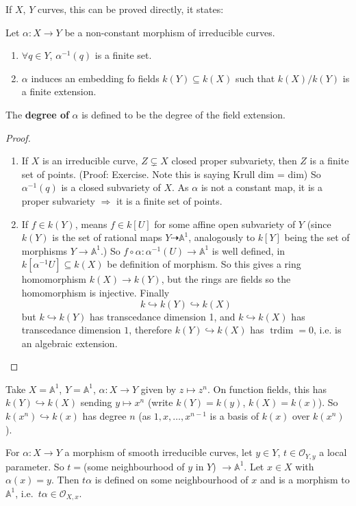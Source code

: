 \documentclass{article}
\newcommand{\A}{\mathbb{A}}
\DeclareMathOperator{\trdim}{trdim}
\begin{document}
If $X$, $Y$ curves, this can be proved directly, it states:
\begin{prop}
    Let $\alpha: X \to Y$ be a non-constant morphism of irreducible curves.
    \begin{enumerate}[label=(\roman*)]
        \item $\forall q \in Y$, $\alpha^{-1}(q)$ is a finite set.
        \item $\alpha$ induces an embedding fo fields $k(Y) \subseteq k(X)$ such that $k(X) / k(Y)$ is a finite extension.
    \end{enumerate}
\end{prop}
\begin{defi}
    The \textbf{degree of} $\alpha$ is defined to be the degree of the field extension.
\end{defi}
\begin{proof} \leavevmode
    \begin{enumerate}[label=(\roman*)]
        \item If $X$ is an irreducible curve, $Z \subsetneq X$ closed proper subvariety, then $Z$ is a finite set of points. (Proof: Exercise. Note this is saying Krull dim = dim)
            So $\alpha^{-1}(q)$ is a closed subvariety of $X$. As $\alpha$ is not a constant map, it is a proper subvariety $\Rightarrow$ it is a finite set of points.
        \item If $f \in k(Y)$, means $f \in k[U]$ for some affine open subvariety of $Y$ (since $k(Y)$ is the set of rational maps $Y \dashrightarrow \A^1$, analogously to $k[Y]$ being the set of morphisms $Y \to \A^1$.)
            So $f \circ \alpha: \alpha^{-1}(U) \to \A^1$ is well defined, in $k[\alpha^{-1} U] \subseteq k(X)$ be definition of morphism.
            So this gives a ring homomorphism $k(X) \to k(Y)$, but the rings are fields so the homomorphism is injective.
            Finally
            \begin{equation*}
                k \hookrightarrow k(Y) \hookrightarrow k(X)
            \end{equation*}
            but $k \hookrightarrow k(Y)$ has transcedance dimension 1, and $k \hookrightarrow k(X)$ has transcedance dimension $1$, therefore $k(Y) \hookrightarrow k(X)$ has $\trdim = 0$, i.e. is an algebraic extension.
    \end{enumerate}
\end{proof}
\begin{eg}
    Take $X =\A^1$, $Y = \A^1$, $\alpha: X \to Y$ given by $z \mapsto z^n$. On function fields, this has $k(Y) \hookrightarrow k(X)$ sending $y \mapsto x^n$ (write $k(Y) = k(y)$, $k(X) = k(x)$).
    So $k(x^n) \hookrightarrow k(x)$ has degree $n$ (as $1, x, \dotsc, x^{n-1}$ is a basis of $k(x)$ over $k(x^n)$).
\end{eg}
For $\alpha: X \to Y$ a morphism of smooth irreducible curves, let $y \in Y$, $t \in \mathcal{O}_{Y, y}$ a local parameter.
So $t = $(some neighbourhood of $y$ in $Y$) $\to \A^1$.
Let $x \in X$ with $\alpha(x) = y$. Then $t\alpha$ is defined on some neighbourhood of $x$ and is a morphism to $\A^1$, i.e.\ $t \alpha \in \mathcal{O}_{X,x}$.
\end{document}

